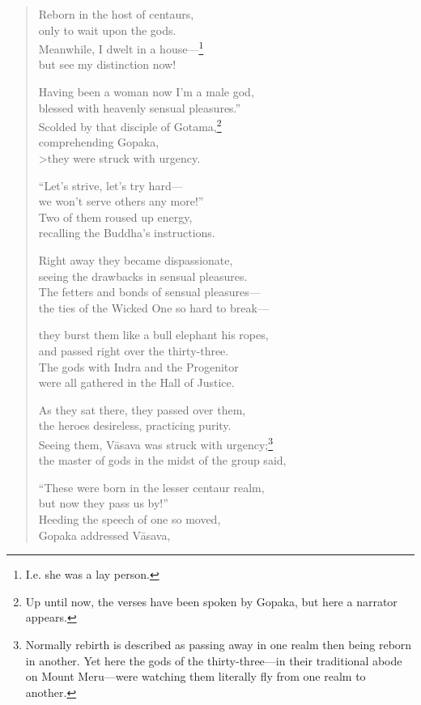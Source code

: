 \documentclass[12pt,openany]{book}%
\begin{document}
\begin{verse}
Reborn in the host of centaurs, \\
only to wait upon the gods. \\
Meanwhile, I dwelt in a house—\footnote{I.e. she was a lay person. } \\
but see my distinction now! 

Having been a woman now I’m a male god, \\
blessed with heavenly sensual pleasures.” \\
Scolded by that disciple of Gotama,\footnote{Up until now, the verses have been spoken by Gopaka, but here a narrator appears. } \\
comprehending Gopaka, \\>they were struck with urgency. 

“Let’s strive, let’s try hard—\\
we won’t serve others any more!” \\
Two of them roused up energy, \\
recalling the Buddha’s instructions. 

Right away they became dispassionate, \\
seeing the drawbacks in sensual pleasures. \\
The fetters and bonds of sensual pleasures—\\
the ties of the Wicked One so hard to break—

they burst them like a bull elephant his ropes, \\
and passed right over the thirty-three. \\
The gods with Indra and the Progenitor \\
were all gathered in the Hall of Justice. 

As they sat there, they passed over them, \\
the heroes desireless, practicing purity. \\
Seeing them, \textsanskrit{Vāsava} was struck with urgency;\footnote{Normally rebirth is described as passing away in one realm then being reborn in another. Yet here the gods of the thirty-three—in their traditional abode on Mount Meru—were watching them literally fly from one realm to another. } \\
the master of gods in the midst of the group said, 

“These were born in the lesser centaur realm, \\
but now they pass us by!” \\
Heeding the speech of one so moved, \\
Gopaka addressed \textsanskrit{Vāsava}, 


\end{verse}
\end{document}
